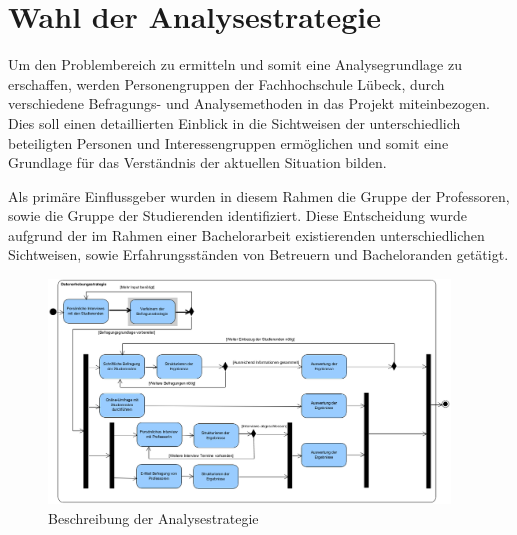 \documentclass{scrreprt}
\begin{document}
\section{Wahl der Analysestrategie}
\par Um den Problembereich zu ermitteln und somit eine Analysegrundlage zu erschaffen, werden Personengruppen der Fachhochschule Lübeck, durch verschiedene Befragungs- und Analysemethoden in das Projekt miteinbezogen. Dies soll einen detaillierten Einblick in die Sichtweisen der unterschiedlich beteiligten Personen und Interessengruppen ermöglichen und somit eine Grundlage für das Verständnis der aktuellen Situation bilden.

\par Als primäre Einflussgeber wurden in diesem Rahmen die Gruppe der Professoren, sowie die Gruppe der Studierenden identifiziert. Diese Entscheidung wurde aufgrund der im Rahmen einer Bachelorarbeit  existierenden unterschiedlichen Sichtweisen, sowie Erfahrungsständen von Betreuern und Bacheloranden getätigt.

\begin{figure}[H]
	\centering
	\includegraphics[width=0.95\textwidth, keepaspectratio]{Bilder/Diagramme/Analysestrategie.png}
	\caption{Beschreibung der Analysestrategie}
	\label{img:analysestrategie}
\end{figure}
\end{document}
